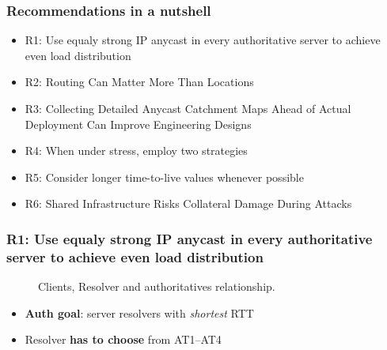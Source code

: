 \documentclass[11pt,show 
notes,notheorems,noamsthm,blank]{beamer} %
\begin{document}
\begin{frame}
 \frametitle{Recommendations in a nutshell}
 
 \begin{itemize}
  \item R1: Use equaly strong IP anycast in every authoritative server to
    achieve even load distribution
    
  \item R2:  Routing Can Matter More Than Locations
  
  \item R3: Collecting Detailed Anycast Catchment Maps Ahead of Actual
    Deployment Can Improve Engineering Designs
    
  \item R4:    When under stress, employ two strategies
  
  \item R5:  Consider longer time-to-live values whenever possible 
  
    \item R6:  Shared Infrastructure Risks Collateral Damage During Attacks
    


  

 \end{itemize}

\end{frame}


\begin{frame}
 \frametitle{ R1: Use equaly strong IP anycast in every authoritative server to
    achieve even load distribution}
    
    
    
\begin{figure}
\centering

  
  \caption{Clients, Resolver and authoritatives relationship.}
  \label{fig:nl-deployment}

\end{figure}
\vspace{-0.5cm}
\begin{itemize}
 \item\textbf{Auth goal}: server resolvers with \textit{shortest} RTT
 \item Resolver \textbf{has to choose} from AT1--AT4
\end{itemize}



\end{frame}
\end{document}

